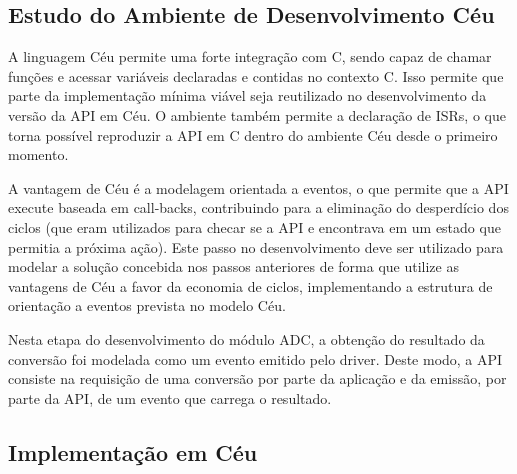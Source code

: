 \documentclass{article}
\begin{document}
\subsection{Estudo do Ambiente de Desenvolvimento Céu}

\tab A linguagem Céu permite uma forte integração com C, sendo capaz de chamar funções e acessar
variáveis declaradas e contidas no contexto C. Isso permite que parte da implementação mínima
viável seja reutilizado no desenvolvimento da versão da API em Céu. O ambiente também permite a
declaração de ISRs, o que torna possível reproduzir a API em C dentro do ambiente Céu desde o
primeiro momento.
\par A vantagem de Céu é a modelagem orientada a eventos, o que permite que a API execute baseada
em call-backs, contribuindo para a eliminação do desperdício dos ciclos (que eram utilizados para
checar se a API e encontrava em um estado que permitia a próxima ação). Este passo no
desenvolvimento deve ser utilizado para modelar a solução concebida nos passos anteriores de forma
que utilize as vantagens de Céu a favor da economia de ciclos, implementando a estrutura de
orientação a eventos prevista no modelo Céu.
\par Nesta etapa do desenvolvimento do módulo ADC, a obtenção do resultado da conversão foi
modelada como um evento emitido pelo driver. Deste modo, a API consiste na requisição de uma
conversão por parte da aplicação e da emissão, por parte da API, de um evento que carrega o
resultado.

\subsection{Implementação em Céu}
\end{document}
